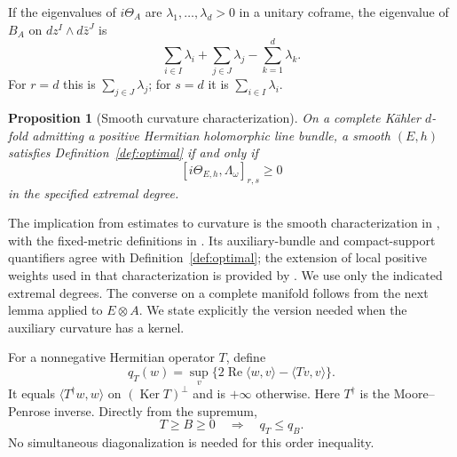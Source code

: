 \documentclass[11pt,reqno]{amsart}
\numberwithin{equation}{section}
\newtheorem{proposition}[theorem]{Proposition}
\theoremstyle{definition}
\theoremstyle{remark}
\newcommand{\Ker}{\operatorname{Ker}}
\newcommand{\ip}[2]{\langle #1,#2\rangle}
\begin{document}
If the eigenvalues of $i\Theta_A$ are $\lambda_1,\ldots,\lambda_d>0$ in a unitary coframe, the eigenvalue of $B_A$ on $dz^I\wedge d\bar z^J$ is
\begin{equation}\label{eq:scalar-eigenvalues}
 \sum_{i\in I}\lambda_i+\sum_{j\in J}\lambda_j
       -\sum_{k=1}^d\lambda_k.
\end{equation}
For $r=d$ this is $\sum_{j\in J}\lambda_j$; for $s=d$ it is $\sum_{i\in I}\lambda_i$.

\begin{proposition}[Smooth curvature characterization]\label{prop:characterization}
On a complete K\"ahler $d$-fold admitting a positive Hermitian holomorphic line bundle, a smooth $(E,h)$ satisfies Definition~\ref{def:optimal} if and only if
\begin{equation}\label{eq:characterization}
 [i\Theta_{E,h},\Lambda_\omega]_{r,s}\geq0
\end{equation}
in the specified extremal degree.
\end{proposition}
The implication from estimates to curvature is the smooth characterization in \cite[Theorems 1.5--1.6]{Wat21}, with the fixed-metric definitions in \cite[Definitions 1.3--1.4]{Wat21}. Its auxiliary-bundle and compact-support quantifiers agree with Definition~\ref{def:optimal}; the extension of local positive weights used in that characterization is provided by \cite[Proposition 3.1]{Wat21}. We use only the indicated extremal degrees. The converse on a complete manifold follows from the next lemma applied to $E\otimes A$. We state explicitly the version needed when the auxiliary curvature has a kernel.

For a nonnegative Hermitian operator $T$, define
\begin{equation}\label{eq:extended-inverse}
 q_T(w)=\sup_v\{2\operatorname{Re}\ip{w}{v}-\ip{Tv}{v}\}.
\end{equation}
It equals $\ip{T^\dagger w}{w}$ on $(\Ker T)^\perp$ and is $+\infty$ otherwise. Here $T^\dagger$ is the Moore--Penrose inverse. Directly from the supremum,
\begin{equation}\label{eq:inverse-order}
 T\geq B\geq0\quad\Longrightarrow\quad q_T\leq q_B.
\end{equation}
No simultaneous diagonalization is needed for this order inequality.
\end{document}
